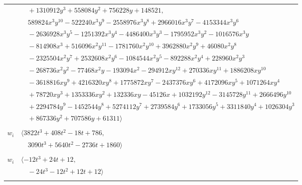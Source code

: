 \documentclass[11pt]{article}
\begin{document}
\begin{longtable}{@{}ll@{}}
 & $\quad +1310912y^{3}+558084y^{2}+756228y+148521,$\\
 & $\quad 589824x^{3}y^{10}-522240x^{3}y^{9}-2558976x^{3}y^{8}+2966016x^{3}y^{7}-4153344x^{3}y^{6}$\\
 & $\quad -2636928x^{3}y^{5}-1251392x^{3}y^{4}-4486400x^{3}y^{3}-1795952x^{3}y^{2}-1016576x^{3}y$\\
 & $\quad -814908x^{3}+516096x^{2}y^{11}-1781760x^{2}y^{10}+3962880x^{2}y^{9}+46080x^{2}y^{8}$\\
 & $\quad -2325504x^{2}y^{7}+2532608x^{2}y^{6}-1084544x^{2}y^{5}-892288x^{2}y^{4}+228960x^{2}y^{3}$\\
 & $\quad -268736x^{2}y^{2}-77468x^{2}y-193094x^{2}-294912xy^{12}+270336xy^{11}+1886208xy^{10}$\\
 & $\quad -3618816xy^{9}+4216320xy^{8}+1775872xy^{7}-2437376xy^{6}+4172096xy^{5}+1071264xy^{4}$\\
 & $\quad +78720xy^{3}+1353336xy^{2}+132336xy-45126x+1032192y^{12}-3145728y^{11}+2666496y^{10}$\\
 & $\quad +2294784y^{9}-1452544y^{8}+5274112y^{7}+2739584y^{6}+1733056y^{5}+3311840y^{4}+1026304y^{3}$\\
 & $\quad +867336y^{2}+707586y+61311\rangle$\\
\addlinespace[2pt]
\multicolumn{2}{@{}p{0.97\textwidth}@{}}{$i=64$, $D_i=243$, $\rho_{ij}$: $6{:}1, \allowbreak 9{:}1, \allowbreak 15{:}1, \allowbreak 16{:}2, \allowbreak 24{:}2, \allowbreak 27{:}2, \allowbreak 38{:}1, \allowbreak 39{:}1, \allowbreak 40{:}1, \allowbreak 42{:}1, \allowbreak 48{:}1, \allowbreak 49{:}1, \allowbreak 54{:}1, \allowbreak 55{:}1$}\\
$w_i$ & $\langle 3822t^{3}+408t^{2}-18t+786,$\\
 & $\quad 3090t^{3}+5640t^{2}-2736t+1860\rangle$\\
\addlinespace[2pt]
\multicolumn{2}{@{}p{0.97\textwidth}@{}}{$i=65$, $D_i=1$, $\rho_{ij}$: $9{:}1, \allowbreak 13{:}2, \allowbreak 15{:}2, \allowbreak 16{:}1, \allowbreak 34{:}1, \allowbreak 40{:}1, \allowbreak 45{:}1, \allowbreak 46{:}2, \allowbreak 56{:}2, \allowbreak 66{:}1$}\\
$w_i$ & $\langle -12t^{3}+24t+12,$\\
 & $\quad -24t^{3}-12t^{2}+12t+12\rangle$\\
\addlinespace[2pt]
\multicolumn{2}{@{}p{0.97\textwidth}@{}}{$i=66$, $D_i=3$, $\rho_{ij}$: $3{:}2, \allowbreak 60{:}1, \allowbreak 63{:}2, \allowbreak 65{:}2, \allowbreak 70{:}1, \allowbreak 74{:}2$}\\

\end{longtable}
\end{document}

